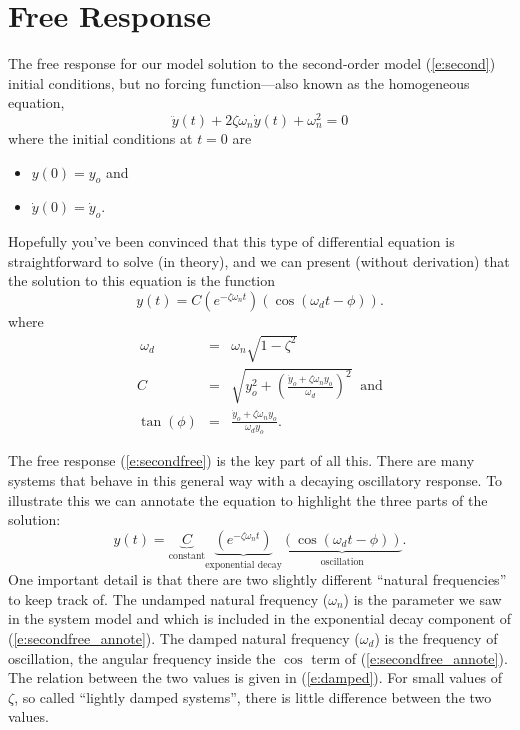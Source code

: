 \section{Free Response}\label{s:secondfree}
The free response for our model solution to the second-order model (\ref{e:second}) initial conditions, but no forcing function---also known as the homogeneous equation,
\begin{equation} \label{e:secondhomo}
\ddot{y}(t) + 2 \zeta \omega_n \dot{y}(t) + \omega_n^2 = 0
\end{equation} 
where the initial conditions at $t=0$ are
\begin{itemize}
\item $y(0) = y_o$ and 
\item $\dot{y}(0)=\dot{y}_o$.
\end{itemize}
Hopefully you've been convinced that this type of differential equation is straightforward to solve (in theory), and we can present (without derivation) that the solution to this equation is the function
\begin{equation} \label{e:secondfree}
y(t) = C \left(e^{-\zeta \omega_n t}\right) \left( \cos(\omega_d t - \phi) \right).
\end{equation}
where
\begin{eqnarray}\
\omega_d & = & \omega_n \sqrt{1-\zeta^2} \label{e:damped} \\
C & = & \sqrt{ y_o^2 + \left( \frac{\dot{y}_o+\zeta\omega_n y_o}{\omega_d} \right)^2 } \;\; \mathrm{and}\label{e:C} \\
\tan(\phi) & = & \frac{\dot{y}_o+\zeta \omega_n y_o}{\omega_d y_o}. \label{e:phi}
\end{eqnarray}

The free response (\ref{e:secondfree}) is the key part of all this.  There are many systems that behave in this general way with a decaying oscillatory response.  To illustrate this we can annotate the equation to highlight the three parts of the solution:
\begin{equation} \label{e:secondfree_annote}
y(t) = \underbrace{C}_\text{constant} 
\underbrace{\left(e^{-\zeta \omega_n t}\right)}_\text{exponential decay}
\underbrace{\left( \cos(\omega_d t - \phi) \right)}_\text{oscillation}.
\end{equation}
One important detail is that there are two slightly different ``natural frequencies'' to keep track of.  The \gls{undamped natural frequency} ($\omega_n$) is the parameter we saw in the system model and which is included in the exponential decay component of (\ref{e:secondfree_annote}).  The \gls{damped natural frequency} ($\omega_d$) is the frequency of oscillation, the angular frequency inside the $\cos$ term of (\ref{e:secondfree_annote}).  The relation between the two values is given in (\ref{e:damped}).  For small values of $\zeta$, so called ``lightly damped systems'', there is little difference between the two values.


